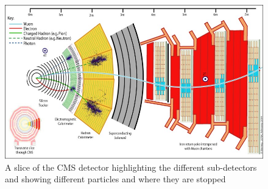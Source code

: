 \begin{figure}
\centering
\includegraphics[width=\linewidth]{CMSlayout.jpg}
\caption{A slice of the CMS detector highlighting the different sub-detectors and showing different particles and where they are stopped}
\label{fig:CMSlayout}
\end{figure}

